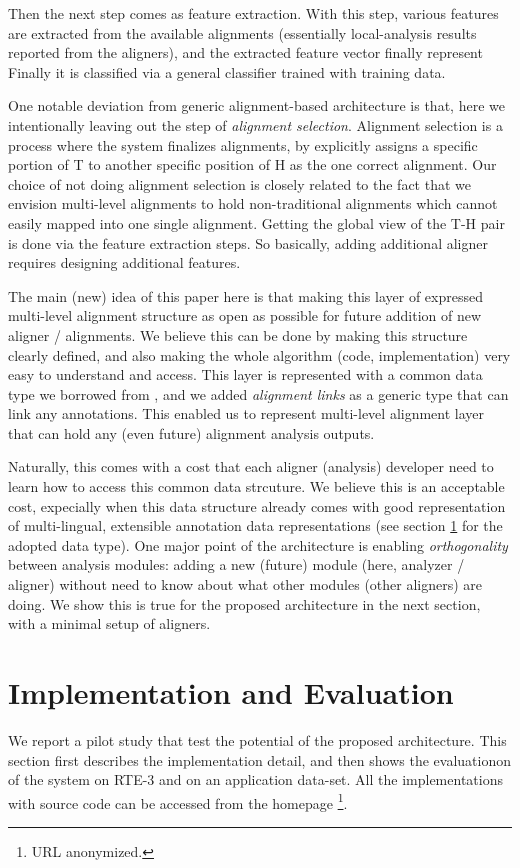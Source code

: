 \documentclass[11pt,letterpaper]{article}
\begin{document}
Then the next step comes as feature extraction. With this step,
various features are extracted from the available alignments
(essentially local-analysis results reported from the aligners), and
the extracted feature vector finally represent
Finally it is classified via a general classifier trained with
training data.

One notable deviation from generic alignment-based architecture is
that, here we intentionally leaving out the step of {\em alignment 
  selection}. Alignment selection is a process where the system
finalizes alignments, by explicitly assigns a specific portion of T to
another specific position of H as the one correct alignment. Our
choice of not doing alignment selection is closely related to the fact
that we envision multi-level alignments to hold non-traditional
alignments which cannot easily mapped into one single
alignment. Getting the global view of the T-H pair is done via the
feature extraction steps. So basically, adding additional aligner
requires designing additional features. 

% 
The main (new) idea of this paper here is that making this layer of
expressed multi-level alignment structure as open as possible for
future addition of new aligner / alignments. We believe this can be
done by making this structure clearly defined, and also making the
whole algorithm (code, implementation) very easy to understand and
access. This layer is  represented with a common data type we borrowed
from \cite{}, and we added {\em alignment links} as a generic type
that can link any annotations. This enabled us to represent
multi-level alignment layer that can hold any (even future) alignment
analysis outputs.   

Naturally, this comes with a cost that each aligner (analysis)
developer need to learn how to access this common data strcuture.
We believe this is an acceptable cost, expecially when this data
structure already comes with good representation of multi-lingual,
extensible annotation data representations (see section
\ref{sec:impl} for the adopted data type). One major point of the
architecture is enabling {\em orthogonality} \cite{} between analysis
modules: adding a new (future) module (here, analyzer / aligner)
without need to know about what other modules (other aligners) are
doing. We show this is true for the proposed architecture in the next
section, with a minimal setup of aligners.    

\section{Implementation and Evaluation}
\label{sec:impl}
We report a pilot study that test the potential of the proposed
architecture. This section first describes the implementation detail,
and then shows the evaluationon of the system on RTE-3 and on an
application data-set. All the implementations with source code can
be accessed from the homepage \footnote{{URL} anonymized.}.  
\end{document}
